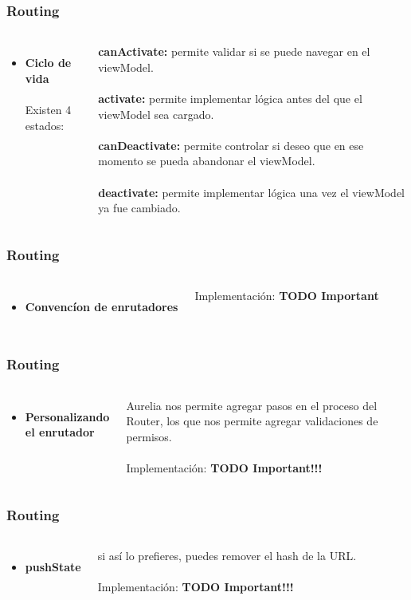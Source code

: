 \documentclass{beamer}
\begin{document}
\begin{frame}
\frametitle{Routing}
\begin{columns}[c]
\begin{itemize}
\item \textbf{Ciclo de vida}
\\~\\
Existen 4 estados:
\end{itemize}
\textbf{canActivate:} permite validar si se puede navegar en el viewModel.
\\~\\
\textbf{activate:} permite implementar l\'ogica antes del que el viewModel sea cargado.
\\~\\
\textbf{canDeactivate:} permite controlar si deseo que en ese momento se pueda abandonar el viewModel.
\\~\\
\textbf{deactivate:} permite implementar l\'ogica una vez el viewModel ya fue cambiado.
\end{columns}
\end{frame}
\begin{frame}
\frametitle{Routing}
\begin{columns}[c]
\begin{itemize}
\item \textbf{Convenc\'ion de enrutadores}
\end{itemize}
Implementaci\'on: \textbf{TODO Important}
\end{columns}
\end{frame}
\begin{frame}
\frametitle{Routing}
\begin{columns}[c]
\begin{itemize}
\item \textbf{Personalizando el enrutador}
\end{itemize}
Aurelia nos permite agregar pasos en el proceso del Router, los que nos permite agregar validaciones de permisos.
\\~\\
Implementaci\'on: \textbf{TODO Important!!!}
\end{columns}
\end{frame}
\begin{frame}
\frametitle{Routing}
\begin{columns}[c]
\begin{itemize}
\item \textbf{pushState}
\end{itemize}
si as\'i lo prefieres, puedes remover el hash de la URL.
\\~\\
Implementaci\'on: \textbf{TODO Important!!!}
\end{columns}
\end{frame}
\end{document}
